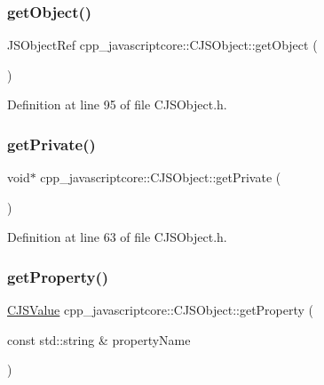 \subsubsection{\texorpdfstring{get\+Object()}{getObject()}}
{\footnotesize\ttfamily J\+S\+Object\+Ref cpp\+\_\+javascriptcore\+::\+C\+J\+S\+Object\+::get\+Object (\begin{DoxyParamCaption}{ }\end{DoxyParamCaption})\hspace{0.3cm}{\ttfamily [inline]}}



Definition at line 95 of file C\+J\+S\+Object.\+h.

\mbox{\label{classcpp__javascriptcore_1_1_c_j_s_object_a2627185e8dc48a71d43f7a7dbb1e6f12}} 
\subsubsection{\texorpdfstring{get\+Private()}{getPrivate()}}
{\footnotesize\ttfamily void$\ast$ cpp\+\_\+javascriptcore\+::\+C\+J\+S\+Object\+::get\+Private (\begin{DoxyParamCaption}{ }\end{DoxyParamCaption})\hspace{0.3cm}{\ttfamily [inline]}}



Definition at line 63 of file C\+J\+S\+Object.\+h.

\mbox{\label{classcpp__javascriptcore_1_1_c_j_s_object_aac86591daacf1f5ec00410c555114269}} 
\subsubsection{\texorpdfstring{get\+Property()}{getProperty()}}
{\footnotesize\ttfamily \mbox{\hyperlink{classcpp__javascriptcore_1_1_c_j_s_value}{C\+J\+S\+Value}} cpp\+\_\+javascriptcore\+::\+C\+J\+S\+Object\+::get\+Property (\begin{DoxyParamCaption}\item[{const std\+::string \&}]{property\+Name }\end{DoxyParamCaption})\hspace{0.3cm}{\ttfamily [inline]}}



